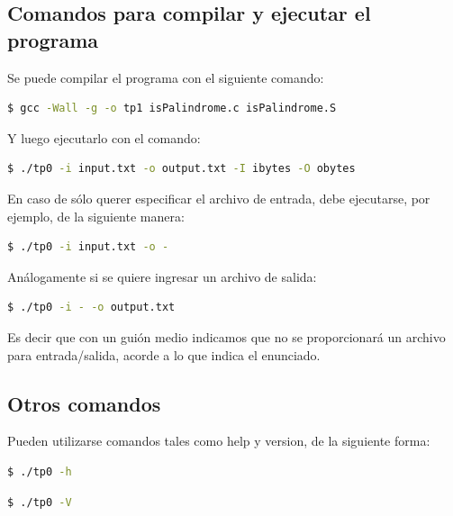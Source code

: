 \documentclass[a4paper]{article}
\begin{document}
\subsection{Comandos para compilar y ejecutar el programa}

Se puede compilar el programa con el siguiente comando:

\begin{lstlisting}[language=bash]
  $ gcc -Wall -g -o tp1 isPalindrome.c isPalindrome.S
\end{lstlisting}


Y luego ejecutarlo con el comando:

\begin{lstlisting}[language=bash]
  $ ./tp0 -i input.txt -o output.txt -I ibytes -O obytes
\end{lstlisting}

En caso de sólo querer especificar el archivo de entrada, debe ejecutarse, por ejemplo, de la siguiente manera:

\begin{lstlisting}[language=bash]
  $ ./tp0 -i input.txt -o -
\end{lstlisting}

Análogamente si se quiere ingresar un archivo de salida:

\begin{lstlisting}[language=bash]
  $ ./tp0 -i - -o output.txt
\end{lstlisting}

Es decir que con un guión medio indicamos que no se proporcionará un archivo para entrada/salida, acorde a lo que indica el enunciado.

\subsection{Otros comandos}

Pueden utilizarse comandos tales como help y version, de la siguiente forma:

\begin{lstlisting}[language=bash]
  $ ./tp0 -h
\end{lstlisting}

\begin{lstlisting}[language=bash]
  $ ./tp0 -V
\end{lstlisting}
\end{document}
